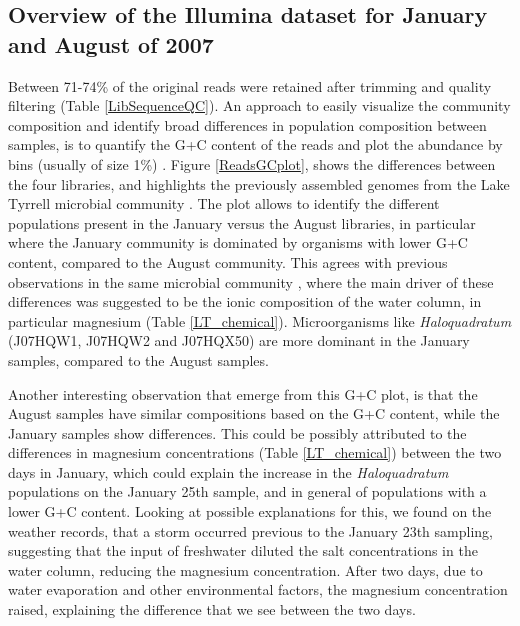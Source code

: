 \subsection{Overview of the Illumina dataset for January and August of 2007}

Between 71-74\% of the original reads were retained after trimming and quality filtering (Table \ref{LibSequenceQC}). An approach to easily visualize the community composition and identify broad differences in population composition between samples, is to quantify the G+C content of the reads and plot the abundance by bins (usually of size 1\%) \cite{Podell:2013kx,Ghai:2012fb,Podell:2013fp}. Figure \ref{ReadsGCplot}, shows the differences between the four libraries, and highlights the previously assembled genomes from the Lake Tyrrell microbial community \cite{Narasingarao:2012kp,Podell:2013kx,Podell:2013fp}. The plot allows to identify the different populations present in the January versus the August libraries, in particular where the January community is dominated by organisms with lower G+C content, compared to the August community. This agrees with previous observations in the same microbial community \cite{Podell:2013fp}, where the main driver of these differences was suggested to be the ionic composition of the water column, in particular magnesium (Table \ref{LT_chemical}). Microorganisms like \textit{Haloquadratum} (J07HQW1, J07HQW2 and J07HQX50) are more dominant in the January samples, compared to the August samples. 

Another interesting observation that emerge from this G+C plot, is that the August samples have similar compositions based on the G+C content, while the January samples show differences. This could be possibly attributed to the differences in magnesium concentrations (Table \ref{LT_chemical}) between the two days in January, which could explain the increase in the \textit{Haloquadratum} populations on the January 25th sample, and in general of populations with a lower G+C content. Looking at possible explanations for this, we found on the weather records, that a storm occurred previous to the January 23th sampling, suggesting that the input of freshwater diluted the salt concentrations in the water column, reducing the magnesium concentration. After two days, due to water evaporation and other environmental factors, the magnesium concentration raised, explaining the difference that we see between the two days.



